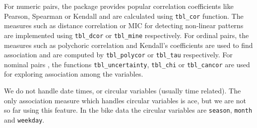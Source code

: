 \begin{table}

\caption{\label{tab:association-measures}List of the functions available in the package for calculating different association measures along with the packages used for calculation.}
\centering
{}
\end{table}

For numeric pairs, the package provides popular correlation coefficients like Pearson, Spearman or Kendall and are calculated using \texttt{tbl\_cor} function. The measures such as distance correlation or MIC for detecting non-linear patterns are implemented using \texttt{tbl\_dcor} or \texttt{tbl\_mine} respectively. For ordinal pairs, the measures such as polychoric correlation and Kendall's coefficients are used to find association and are computed by \texttt{tbl\_polycor} or \texttt{tbl\_tau} respectively. For nominal pairs , the functions \texttt{tbl\_uncertainty}, \texttt{tbl\_chi} or \texttt{tbl\_cancor} are used for exploring association among the variables.

We do not handle date times, or circular variables (usually time related). The only association measure which handles circular variables is ace, but we are not so far using this feature. In the bike data the circular variables are \texttt{season}, \texttt{month} and \texttt{weekday}.

